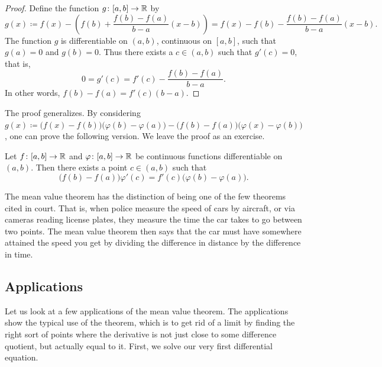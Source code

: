 \begin{proof}
Define the
function $g \colon [a,b] \to {\mathbb{R}}$ by
\begin{equation*}
g(x) \coloneqq
f(x)-
\left( f(b)+\frac{f(b)-f(a)}{b-a}(x-b) \right)
=
f(x)-
f(b)-\frac{f(b)-f(a)}{b-a}(x-b) .
\end{equation*}
The function $g$ is differentiable on $(a,b)$,
continuous on $[a,b]$, such that $g(a) = 0$ and $g(b) = 0$.  Thus there exists
a
$c \in (a,b)$ such that $g'(c) = 0$, that is,
\begin{equation*}
0 = g'(c) = f'(c)-\frac{f(b)-f(a)}{b-a} .
\end{equation*}
In other words,
$f(b)-f(a) = f'(c)(b-a)$.
\end{proof}

The proof generalizes.  By considering
$g(x) \coloneqq
\bigl(f(x)-f(b)\bigr)
\bigl(\varphi(b)-\varphi(a)\bigr)
-
\bigl(f(b)-f(a)\bigr)
\bigl(\varphi(x)-\varphi(b)\bigr)$,
one can prove the following version.  We leave the proof as an exercise.

\begin{thm} \label{thm:cauchymvt}
Let $f \colon [a,b] \to {\mathbb{R}}$ and $\varphi \colon [a,b] \to {\mathbb{R}}$ be continuous
functions
differentiable on $(a,b)$.  Then there exists a point $c \in (a,b)$
such that
\begin{equation*}
\bigl(f(b)-f(a)\bigr)\varphi'(c) = f'(c)\bigl(\varphi(b)-\varphi(a)\bigr) .
\end{equation*}
\end{thm}

The mean value theorem has the distinction of being one of the few theorems
cited
in court.  That is, when police measure the speed of cars by aircraft, or
via cameras reading license plates, they 
measure the time the car takes to go between two points.
The mean value theorem then
says that the car must have somewhere attained the speed you get by dividing the
difference in distance by the difference in time.



\subsection{Applications}

Let us look at a few applications of the mean value theorem.
The applications show the typical use of the theorem, which is
to get rid of a limit by finding the right sort of points where the
derivative is not just close to some difference quotient, but actually
equal to it.
First, we solve our very first differential equation.


